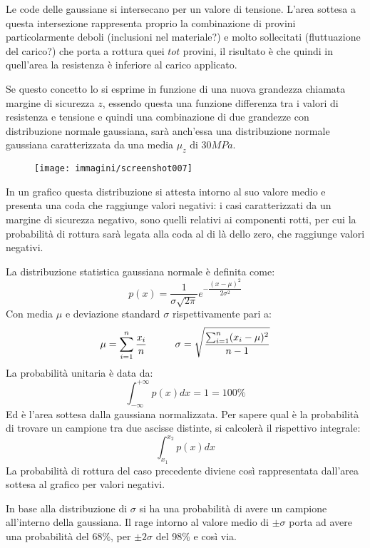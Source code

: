 \documentclass{article}
\begin{document}
\begin{adjustwidth}{2in}{}
     	Le code delle gaussiane si intersecano per un valore di tensione. L'area sottesa a questa intersezione rappresenta proprio la combinazione di provini particolarmente deboli (inclusioni nel materiale?) e molto sollecitati (fluttuazione del carico?) che porta a rottura quei $tot$ provini, il risultato è che quindi in quell'area la resistenza è inferiore al carico applicato. \newline
     	
     	Se questo concetto lo si esprime in funzione di una nuova grandezza chiamata margine di sicurezza $z$, essendo questa una funzione differenza tra i valori di resistenza e tensione e quindi una combinazione di due grandezze con distribuzione normale gaussiana, sarà anch'essa una distribuzione normale gaussiana caratterizzata da una media $\mu_z$ di $ 30MPa $. 
     	
     	\begin{figure}[H]
     		\centering
     		\texttt{[image: immagini/screenshot007]}
     		\label{fig:screenshot007}
     	\end{figure}
     	     	
     	In un grafico questa distribuzione si attesta intorno al suo valore medio e presenta una coda che raggiunge valori negativi: i casi caratterizzati da un margine di sicurezza negativo, sono quelli relativi ai componenti rotti, per cui la probabilità di rottura sarà legata alla coda al di là dello zero, che raggiunge valori negativi. 
     	
     	La distribuzione statistica gaussiana normale è definita come:
     	\[p(x) = \dfrac{1}{\sigma\sqrt{2\pi}}e^{-\dfrac{(x-\mu)^2}{2\sigma^2}} \] 
     	Con media $\mu$ e deviazione standard $\sigma$ rispettivamente pari a:
     	\[\mu = \sum_{i=1}^{n}{x_i\over n} \hspace{1cm} \sigma = 
     	\sqrt{\dfrac{\sum_{i=1}^{n}(x_i-\mu)^2}{n-1}}\]
     	La probabilità unitaria è data da: 
     	\[ \int_{-\infty}^{+\infty} p(x)dx = 1 = 100\%\]
     	Ed è l'area sottesa dalla gaussiana normalizzata. Per sapere qual è la probabilità di trovare un campione tra due ascisse distinte, si calcolerà il rispettivo integrale:
     	\[\int_{x_1}^{x_2} p(x)dx\]
     	La probabilità di rottura del caso precedente diviene così rappresentata dall'area sottesa al grafico per valori negativi. 
     	
     	In base alla distribuzione di $\sigma$ si ha una probabilità di avere un campione all'interno  della gaussiana. Il rage intorno al valore medio di $\pm\sigma$ porta ad avere una probabilità del 68\%, per $\pm2\sigma$ del 98\% e così via.
     	

\end{adjustwidth}
\end{document}
